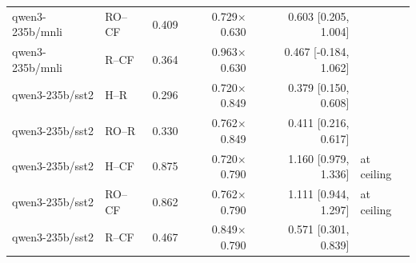 \begin{table}[t]
\begin{tabular}{llrrrl}
qwen3-235b/mnli & RO--CF & 0.409 & 0.729$\times$0.630 & 0.603 [0.205, 1.004] &  \\
qwen3-235b/mnli & R--CF & 0.364 & 0.963$\times$0.630 & 0.467 [-0.184, 1.062] &  \\
qwen3-235b/sst2 & H--R & 0.296 & 0.720$\times$0.849 & 0.379 [0.150, 0.608] &  \\
qwen3-235b/sst2 & RO--R & 0.330 & 0.762$\times$0.849 & 0.411 [0.216, 0.617] &  \\
qwen3-235b/sst2 & H--CF & 0.875 & 0.720$\times$0.790 & 1.160 [0.979, 1.336] & at ceiling \\
qwen3-235b/sst2 & RO--CF & 0.862 & 0.762$\times$0.790 & 1.111 [0.944, 1.297] & at ceiling \\
qwen3-235b/sst2 & R--CF & 0.467 & 0.849$\times$0.790 & 0.571 [0.301, 0.839] &  \\
\bottomrule
\end{tabular}
\end{table}

